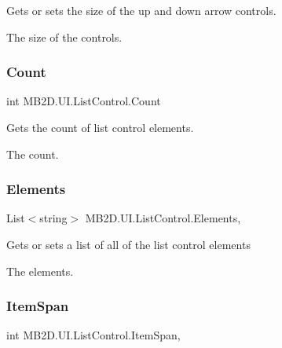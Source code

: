 Gets or sets the size of the up and down arrow controls. 

The size of the controls.\hypertarget{class_m_b2_d_1_1_u_i_1_1_list_control_a231b53abfe2a6040567bb6bc3bf1cee4}{}\label{class_m_b2_d_1_1_u_i_1_1_list_control_a231b53abfe2a6040567bb6bc3bf1cee4} 
\subsubsection{\texorpdfstring{Count}{Count}}
{\footnotesize\ttfamily int M\+B2\+D.\+U\+I.\+List\+Control.\+Count\hspace{0.3cm}{\ttfamily [get]}}



Gets the count of list control elements. 

The count.\hypertarget{class_m_b2_d_1_1_u_i_1_1_list_control_a868436cd81ebe891d8748da7b48a7c30}{}\label{class_m_b2_d_1_1_u_i_1_1_list_control_a868436cd81ebe891d8748da7b48a7c30} 
\subsubsection{\texorpdfstring{Elements}{Elements}}
{\footnotesize\ttfamily List$<$string$>$ M\+B2\+D.\+U\+I.\+List\+Control.\+Elements\hspace{0.3cm}{\ttfamily [get]}, {\ttfamily [set]}}



Gets or sets a list of all of the list control elements 

The elements.\hypertarget{class_m_b2_d_1_1_u_i_1_1_list_control_a67c7e5b6c19678f4c9d1fd111d87f056}{}\label{class_m_b2_d_1_1_u_i_1_1_list_control_a67c7e5b6c19678f4c9d1fd111d87f056} 
\subsubsection{\texorpdfstring{Item\+Span}{ItemSpan}}
{\footnotesize\ttfamily int M\+B2\+D.\+U\+I.\+List\+Control.\+Item\+Span\hspace{0.3cm}{\ttfamily [get]}, {\ttfamily [set]}}



